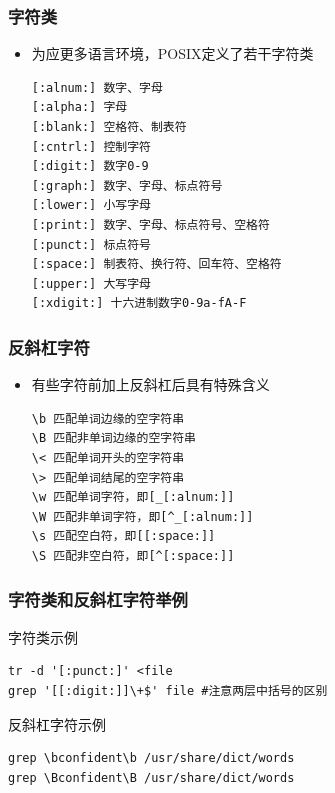 \documentclass[xcolor=svgnames,presentation]{beamer}
\begin{document}
\begin{frame}[fragile]
\frametitle{字符类}
\label{sec-1-1-8}
\begin{itemize}

\item 为应更多语言环境，POSIX定义了若干字符类\\
\label{sec-1-1-8-1}%
\begin{verbatim}
[:alnum:] 数字、字母
[:alpha:] 字母
[:blank:] 空格符、制表符
[:cntrl:] 控制字符
[:digit:] 数字0-9
[:graph:] 数字、字母、标点符号
[:lower:] 小写字母
[:print:] 数字、字母、标点符号、空格符
[:punct:] 标点符号
[:space:] 制表符、换行符、回车符、空格符
[:upper:] 大写字母
[:xdigit:] 十六进制数字0-9a-fA-F
\end{verbatim}
\end{itemize} %
\end{frame}
\begin{frame}[fragile]
\frametitle{反斜杠字符}
\label{sec-1-1-9}
\begin{itemize}

\item 有些字符前加上反斜杠后具有特殊含义\\
\label{sec-1-1-9-1}%
\begin{verbatim}
\b 匹配单词边缘的空字符串
\B 匹配非单词边缘的空字符串
\< 匹配单词开头的空字符串
\> 匹配单词结尾的空字符串
\w 匹配单词字符，即[_[:alnum:]]
\W 匹配非单词字符，即[^_[:alnum:]]
\s 匹配空白符，即[[:space:]]
\S 匹配非空白符，即[^[:space:]]
\end{verbatim}
\end{itemize} %
\end{frame}
\begin{frame}[fragile]
\frametitle{字符类和反斜杠字符举例}
\label{sec-1-1-10}
\begin{exampleblock}{字符类示例}
\label{sec-1-1-10-1}


\begin{verbatim}
tr -d '[:punct:]' <file
grep '[[:digit:]]\+$' file #注意两层中括号的区别
\end{verbatim}
\end{exampleblock}
\begin{block}{反斜杠字符示例}
\label{sec-1-1-10-2}


\begin{verbatim}
grep \bconfident\b /usr/share/dict/words
grep \Bconfident\B /usr/share/dict/words
\end{verbatim}
\end{block}
\end{frame}
\end{document}
